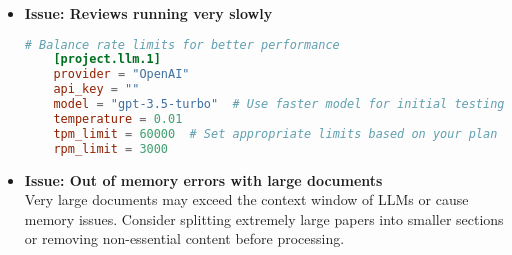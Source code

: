 \begin{itemize}
    \item \textbf{Issue: Reviews running very slowly}

    \begin{configbox}
    \begin{lstlisting}[language=TOML]
    # Balance rate limits for better performance
    [project.llm.1]
    provider = "OpenAI"
    api_key = ""
    model = "gpt-3.5-turbo"  # Use faster model for initial testing
    temperature = 0.01
    tpm_limit = 60000  # Set appropriate limits based on your plan
    rpm_limit = 3000
    \end{lstlisting}
    \end{configbox}

    \item \textbf{Issue: Out of memory errors with large documents}
    \\
    Very large documents may exceed the context window of LLMs or cause memory issues. Consider splitting extremely large papers into smaller sections or removing non-essential content before processing.
\end{itemize}

